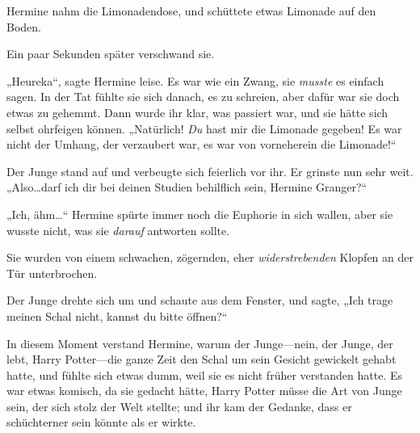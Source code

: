 Hermine nahm die Limonadendose, und schüttete etwas Limonade auf den Boden.

Ein paar Sekunden später verschwand sie.

„Heureka“, sagte Hermine leise. Es war wie ein Zwang, sie \emph{musste} es einfach sagen. In der Tat fühlte sie sich danach, es zu schreien, aber dafür war sie doch etwas zu gehemmt. Dann wurde ihr klar, was passiert war, und sie hätte sich selbst ohrfeigen können. „Natürlich! \emph{Du} hast mir die Limonade gegeben! Es war nicht der Umhang, der verzaubert war, es war von vorneherein die Limonade!“

Der Junge stand auf und verbeugte sich feierlich vor ihr. Er grinste nun sehr weit. „Also…darf ich dir bei deinen Studien behilflich sein, Hermine Granger?“

„Ich, ähm…“ Hermine spürte immer noch die Euphorie in sich wallen, aber sie wusste nicht, was sie \emph{darauf} antworten sollte.

Sie wurden von einem schwachen, zögernden, eher \emph{widerstrebenden} Klopfen an der Tür unterbrochen.

Der Junge drehte sich um und schaute aus dem Fenster, und sagte, „Ich trage meinen Schal nicht, kannst du bitte öffnen?“

In diesem Moment verstand Hermine, warum der Junge—nein, der Junge, der lebt, Harry Potter—die ganze Zeit den Schal um sein Gesicht gewickelt gehabt hatte, und fühlte sich etwas dumm, weil sie es nicht früher verstanden hatte. Es war etwas komisch, da sie gedacht hätte, Harry Potter müsse die Art von Junge sein, der sich stolz der Welt stellte; und ihr kam der Gedanke, dass er schüchterner sein könnte als er wirkte.

